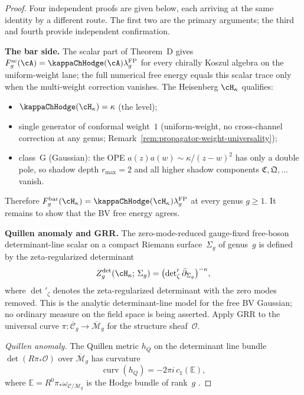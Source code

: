 \begin{proof}
Four independent proofs are given below, each arriving at the same
identity by a different route. The first two are the primary
arguments; the third and fourth provide independent confirmation.

\medskip
\noindent\textbf{The bar side.}
The scalar part of Theorem~D gives
$F_g^{\mathrm{sc}}(\cA)=\kappaChHodge(\cA)\lambda_g^{\mathrm{FP}}$
for every chirally Koszul algebra on the uniform-weight lane; the
full numerical free energy equals this scalar trace only when the
multi-weight correction vanishes.
The Heisenberg $\cH_\kappa$ qualifies:
\begin{itemize}[nosep]
\item $\kappaChHodge(\cH_\kappa) = \kappa$ (the level);
\item single generator of conformal weight~$1$
 (uniform-weight, no cross-channel correction at any genus;
 Remark~\ref{rem:propagator-weight-universality});
\item class~G (Gaussian): the OPE $a(z)a(w) \sim \kappa/(z{-}w)^2$
 has only a double pole, so shadow depth $r_{\max} = 2$ and all
 higher shadow components $\mathfrak{C}, \mathfrak{Q}, \ldots$
 vanish.
\end{itemize}
Therefore
$F_g^{\mathrm{bar}}(\cH_\kappa)
= \kappaChHodge(\cH_\kappa)\lambda_g^{\mathrm{FP}}$
at every genus $g \geq 1$. It remains to show that the BV free
energy agrees.

\medskip
\noindent\textbf{Quillen anomaly and GRR.}
The zero-mode-reduced gauge-fixed free-boson determinant-line scalar
on a compact Riemann surface~$\Sigma_g$ of genus~$g$ is defined by
the zeta-regularized determinant
\begin{equation}\label{eq:bv-partition-heisenberg}
Z_g^{\mathrm{det}}(\cH_\kappa;\,\Sigma_g)
= \bigl(\det\nolimits'_\zeta \bar\partial_{\Sigma_g}\bigr)^{-\kappa},
\end{equation}
where $\det'_\zeta$ denotes the zeta-regularized determinant
with the zero modes removed. This is the analytic determinant-line
model for the free BV Gaussian; no ordinary measure on the field space
is being asserted.
Apply GRR to the universal curve
$\pi\colon \overline{\mathcal{C}}_g
\to \overline{\mathcal{M}}_g$
for the structure sheaf~$\mathcal{O}$.

\emph{Quillen anomaly.} The Quillen metric $h_Q$ on the determinant line bundle
$\det(R\pi_*\mathcal{O})$ over
$\overline{\mathcal{M}}_g$ has curvature
\[
\operatorname{curv}(h_Q)
= -2\pi i\, c_1(\mathbb{E}),
\]
where $\mathbb{E} = R^0\pi_*\omega_{\mathcal{C}/\mathcal{M}_g}$
is the Hodge bundle of rank~$g$ \cite{Quillen85}.


\end{proof}
